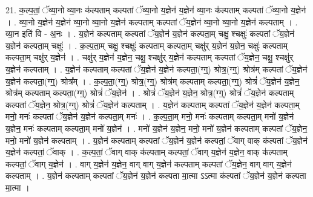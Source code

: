 \documentclass[17pt]{extarticle}
\begin{document}
21. क॒ल्प॒तां॒ ॅव्या॒नो व्या॒नः क॑ल्पताम् कल्पतां ॅव्या॒नो य॒ज्ञेन॑ य॒ज्ञेन॑ व्या॒नः क॑ल्पताम् कल्पतां ॅव्या॒नो य॒ज्ञेन॑ । . व्या॒नो य॒ज्ञेन॑ य॒ज्ञेन॑ व्या॒नो व्या॒नो य॒ज्ञेन॑ कल्पताम् कल्पतां ॅय॒ज्ञेन॑ व्या॒नो व्या॒नो य॒ज्ञेन॑ कल्पताम् । . व्या॒न इति॑ वि - अ॒नः । . य॒ज्ञेन॑ कल्पताम् कल्पतां ॅय॒ज्ञेन॑ य॒ज्ञेन॑ कल्पता॒म् चक्षु॒ श्चक्षुः॑ कल्पतां ॅय॒ज्ञेन॑ य॒ज्ञेन॑ कल्पता॒म् चक्षुः॑ । . क॒ल्प॒ता॒म् चक्षु॒ श्चक्षुः॑ कल्पताम् कल्पता॒म् चक्षु॑र् य॒ज्ञेन॑ य॒ज्ञेन॒ चक्षुः॑ कल्पताम् कल्पता॒म् चक्षु॑र् य॒ज्ञेन॑ । . चक्षु॑र् य॒ज्ञेन॑ य॒ज्ञेन॒ चक्षु॒ श्चक्षु॑र् य॒ज्ञेन॑ कल्पताम् कल्पतां ॅय॒ज्ञेन॒ चक्षु॒ श्चक्षु॑र् य॒ज्ञेन॑ कल्पताम् । . य॒ज्ञेन॑ कल्पताम् कल्पतां ॅय॒ज्ञेन॑ य॒ज्ञेन॑ कल्पता॒(ग्ग्॒) श्रोत्र॒(ग्ग्॒) श्रोत्र॑म् कल्पतां ॅय॒ज्ञेन॑ य॒ज्ञेन॑ कल्पता॒(ग्ग्॒) श्रोत्र᳚म् । . क॒ल्प॒ता॒(ग्ग्॒) श्रोत्र॒(ग्ग्॒) श्रोत्र॑म् कल्पताम् कल्पता॒(ग्ग्॒) श्रोत्रं॑ ॅय॒ज्ञेन॑ य॒ज्ञेन॒ श्रोत्र॑म् कल्पताम् कल्पता॒(ग्ग्॒) श्रोत्रं॑ ॅय॒ज्ञेन॑ । . श्रोत्रं॑ ॅय॒ज्ञेन॑ य॒ज्ञेन॒ श्रोत्र॒(ग्ग्॒) श्रोत्रं॑ ॅय॒ज्ञेन॑ कल्पताम् कल्पतां ॅय॒ज्ञेन॒ श्रोत्र॒(ग्ग्॒) श्रोत्रं॑ ॅय॒ज्ञेन॑ कल्पताम् । . य॒ज्ञेन॑ कल्पताम् कल्पतां ॅय॒ज्ञेन॑ य॒ज्ञेन॑ कल्पता॒म् मनो॒ मनः॑ कल्पतां ॅय॒ज्ञेन॑ य॒ज्ञेन॑ कल्पता॒म् मनः॑ । . क॒ल्प॒ता॒म् मनो॒ मनः॑ कल्पताम् कल्पता॒म् मनो॑ य॒ज्ञेन॑ य॒ज्ञेन॒ मनः॑ कल्पताम् कल्पता॒म् मनो॑ य॒ज्ञेन॑ । . मनो॑ य॒ज्ञेन॑ य॒ज्ञेन॒ मनो॒ मनो॑ य॒ज्ञेन॑ कल्पताम् कल्पतां ॅय॒ज्ञेन॒ मनो॒ मनो॑ य॒ज्ञेन॑ कल्पताम् । . य॒ज्ञेन॑ कल्पताम् कल्पतां ॅय॒ज्ञेन॑ य॒ज्ञेन॑ कल्पतां॒ ॅवाग् वाक् क॑ल्पतां ॅय॒ज्ञेन॑ य॒ज्ञेन॑ कल्पतां॒ ॅवाक् । . क॒ल्प॒तां॒ ॅवाग् वाक् क॑ल्पताम् कल्पतां॒ ॅवाग् य॒ज्ञेन॑ य॒ज्ञेन॒ वाक् क॑ल्पताम् कल्पतां॒ ॅवाग् य॒ज्ञेन॑ । . वाग् य॒ज्ञेन॑ य॒ज्ञेन॒ वाग् वाग् य॒ज्ञेन॑ कल्पताम् कल्पतां ॅय॒ज्ञेन॒ वाग् वाग् य॒ज्ञेन॑ कल्पताम् । . य॒ज्ञेन॑ कल्पताम् कल्पतां ॅय॒ज्ञेन॑ य॒ज्ञेन॑ कल्पता मा॒त्मा ऽऽत्मा क॑ल्पतां ॅय॒ज्ञेन॑ य॒ज्ञेन॑ कल्पता मा॒त्मा । \newline
\end{document}
